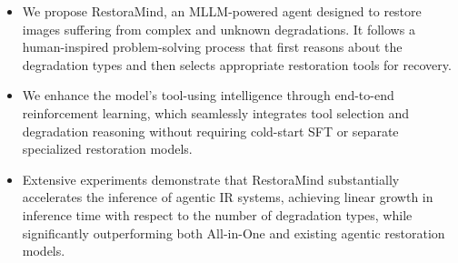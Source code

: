 

\begin{itemize}
\item We propose RestoraMind, an MLLM-powered agent designed to restore images suffering from complex and unknown degradations. It follows a human-inspired problem-solving process that first reasons about the degradation types and then selects appropriate restoration tools for recovery.

\item We enhance the model’s tool-using intelligence through end-to-end reinforcement learning, which seamlessly integrates tool selection and degradation reasoning without requiring cold-start SFT or separate specialized restoration models.

\item Extensive experiments demonstrate that RestoraMind substantially accelerates the inference of agentic IR systems, achieving linear growth in inference time with respect to the number of degradation types, while significantly outperforming both All-in-One and existing agentic restoration models.

\end{itemize}


